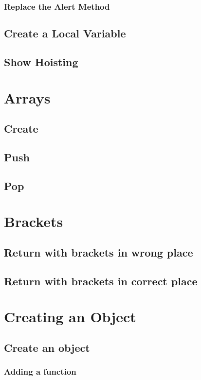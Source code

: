 \documentclass {amsart}
\begin{document}
			\subsubsection{Replace the Alert Method}
	\subsection{Create a Local Variable}
	\subsection{Show Hoisting}
	


\section{Arrays}
	\subsection{Create}
	\subsection{Push}
	\subsection{Pop}

	
\section{Brackets}
	\subsection{Return with brackets in wrong place}
	\subsection{Return with brackets in correct place}

\section{Creating an Object}
	\subsection{Create an object}
		\subsubsection{Adding a function}
\end{document}
